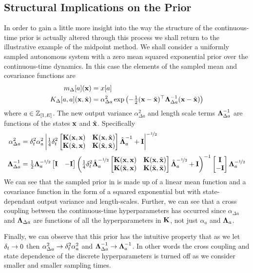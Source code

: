 \subsection{Structural Implications on the Prior} \label{sec:intuition}
In order to gain a little more insight into the way the structure of the continuous-time prior is actually altered through this process we shall return to the illustrative example of the midpoint method. We shall consider a uniformly sampled autonomous system with a zero mean squared exponential prior over the continuous-time dynamics. In this case the elements of the sampled mean and covariance functions are
\begin{align}
m_{\Delta}[a](\mathbf{x}) &= x[a] 
\label{eqn:sampM} \\
K_{\Delta}[a,a](\mathbf{x},\tilde{\mathbf{x}}) &=
\alpha_{\Delta a}^2
\exp\left(-\tfrac{1}{2} (\mathbf{x}-\tilde{\mathbf{x}})^\top
\boldsymbol{\Lambda}_{\Delta a}^{-1}
(\mathbf{x}-\tilde{\mathbf{x}}) \right)
\label{eqn:sampK}
\end{align}
where $a \in \mathbb{Z}_{[1,E]}$. The new output variance $\alpha_{\Delta a}^2$ and length scale terms $\boldsymbol{\Lambda}_{\Delta a}^{-1}$ are functions of the states $\mathbf{x}$ and $\tilde{\mathbf{x}}$. Specifically
\begin{align*}
\alpha_{\Delta a}^2 &=
\Dt^2\alpha_a^2 \left|\tfrac{1}{4}\Dt^2
 \bmat{\bK(\bx,\bx) & \bK(\bx,\tbx) \\ \bK(\tbx,\bx) & \bK(\tbx,\tbx)}
\hat\bLa_{a}\inv + \bI\right|^{-\sha} \\[0.1cm]
%
\bLa_{\Delta a}\inv &=
\half\bLa_{a}^{-\sha} \bmat{\bI & -\bI} \left( \tfrac{1}{4}\Dt^2\hat\bLa_{a}^{-\sha} 
 \bmat{\bK(\bx,\bx) & \bK(\bx,\tbx) \\ \bK(\tbx,\bx) & \bK(\tbx,\tbx)}
\hat\bLa_{a}^{-\sha} + \bI \right)\inv  \bmat{\bI \\ -\bI}\bLa_{a}^{-\sha}
\end{align*}
We can see that the sampled prior in  is made up of a linear mean function and a covariance function in the form of a squared exponential but with state-dependant output variance and length-scales. Further, we can see that a cross coupling between the continuous-time hyperparameters has occurred since $\alpha_{\Delta a}$ and $\boldsymbol{\Lambda}_{\Delta a}$ are functions of all the hyperparameters in $\mathbf{K}$, not just $\alpha_a$ and $\boldsymbol{\Lambda}_a$.

Finally, we can observe that this prior has the intuitive property that as we let $\delta_t \rightarrow 0$ then $\alpha_{\Delta a}^2 \rightarrow \delta_t^2\alpha_a^2$ and $\boldsymbol{\Lambda}_{\Delta a}^{-1} \rightarrow \boldsymbol{\Lambda}_{a}^{-1}$. In other words the cross coupling and state dependence of the discrete hyperparameters is turned off as we consider smaller and smaller sampling times.





